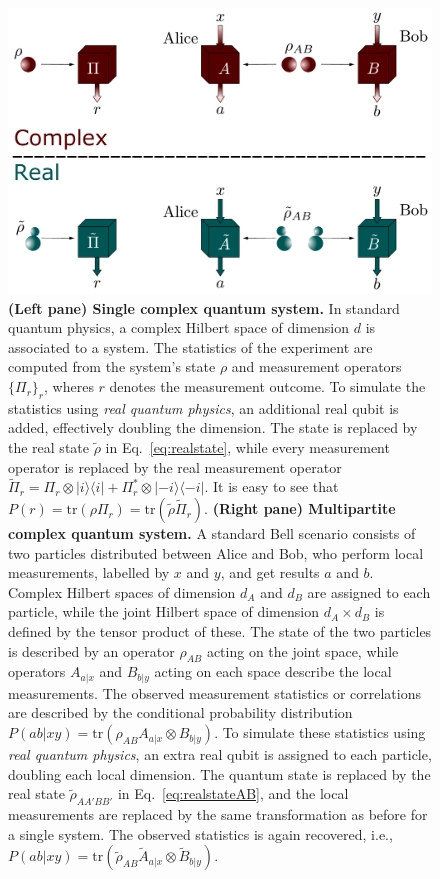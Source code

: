 \documentclass[onecolumn,prx,amsmath,amssymb]{revtex4-2}
\def\bra#1{\langle#1|} \def\ket#1{|#1\rangle}
\def\proj#1{\ket{#1}\!\bra{#1}}
\def\tr{\mbox{tr}}
\begin{document}
\begin{figure}
  \centering
  \includegraphics[width=12cm]{rvsc.pdf}
  \caption{\textbf{(Left pane) Single complex quantum system.} In standard quantum physics, a complex Hilbert space of dimension $d$ is associated to a system. The statistics of the experiment are computed from the system's state $\rho$ and measurement operators $\{\Pi_r\}_r$, wheres $r$ denotes the measurement outcome. To simulate the statistics using {\em real quantum physics}, an additional real qubit is added, effectively doubling the dimension. The state is replaced by the real state $\tilde{\rho}$ in Eq.~\eqref{eq:realstate}, while every measurement operator is replaced by the real measurement operator $\tilde\Pi_r=\Pi_r\otimes\proj{i}+\Pi_r^*\otimes\proj{-i}$. It is easy to see that $P(r)=\tr(\rho\Pi_r)=\tr(\tilde\rho\tilde\Pi_r)$. \textbf{(Right pane) Multipartite complex quantum system.} A standard Bell scenario consists of two particles distributed between Alice and Bob, who perform local measurements, labelled by $x$ and $y$, and get results $a$ and $b$. Complex Hilbert spaces of dimension $d_A$ and $d_B$ are assigned to each particle, while the joint Hilbert space of dimension $d_A\times d_B$ is defined by the tensor product of these. The state of the two particles is described by an operator $\rho_{AB}$ acting on the joint space, while operators $A_{a|x}$ and $B_{b|y}$ acting on each space describe the local measurements. The observed measurement statistics or correlations are described by the conditional probability distribution $P(ab|xy)=\tr(\rho_{AB}A_{a|x}\otimes B_{b|y})$. To simulate these statistics using {\em real quantum physics}, an extra real qubit is assigned to each particle, doubling each local dimension. The quantum state is replaced by the real state $\tilde \rho_{AA'BB'}$ in Eq.~\eqref{eq:realstateAB}, and the local measurements are replaced by the same transformation as before for a single system. The observed statistics is again recovered, i.e., $P(ab|xy)=\tr(\tilde\rho_{AB}\tilde{A}_{a|x}\otimes\tilde{B}_{b|y})$.}
  \label{fig:scenarios}
\end{figure}
\end{document}
